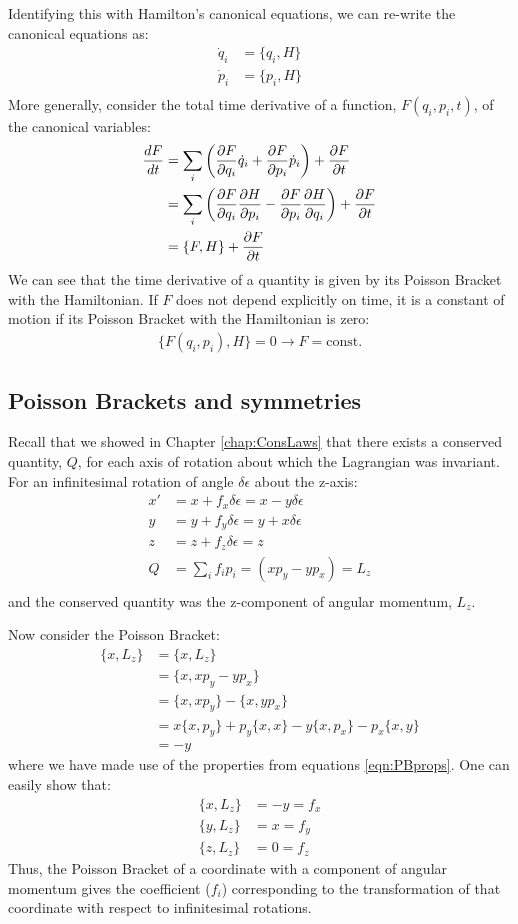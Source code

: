 Identifying this with Hamilton's canonical equations, we can re-write the canonical equations as:
\begin{align}
\dot q_i&=\{q_i,H\}\nonumber\\
\dot p_i&=\{p_i,H\}\nonumber\\
\end{align}
More generally, consider the total time derivative of a function, $F(q_i,p_i,t)$, of the canonical variables:
\begin{align}
\frac{dF}{dt}&=\sum_i\left(\frac{\partial F}{\partial q_i}\dot q_i+\frac{\partial F}{\partial p_i}\dot p_i\right)+\frac{\partial F}{\partial t}\nonumber\\
&=\sum_i\left(\frac{\partial F}{\partial q_i}\frac{\partial H}{\partial p_i}-\frac{\partial F}{\partial p_i}\frac{\partial H}{\partial q_i}\right)+\frac{\partial F}{\partial t}\nonumber\\
&=\{F,H\}+\frac{\partial F}{\partial t}
\end{align}
We can see that the time derivative of a quantity is given by its Poisson Bracket with the Hamiltonian. If $F$ does not depend explicitly on time, it is a constant of motion if its Poisson Bracket with the Hamiltonian is zero:
\begin{align}
\{F(q_i,p_i),H\}=0 \to F=\text{const.}
\end{align}


\subsection{Poisson Brackets and symmetries}
Recall that we showed in Chapter \ref{chap:ConsLaws} that there exists a conserved quantity, $Q$, for each axis of rotation about which the Lagrangian was invariant.  For an infinitesimal rotation of angle $\delta \epsilon$ about the z-axis:
\begin{align}
x' &= x+f_x\delta\epsilon = x-y\delta \epsilon\nonumber\\
y &= y+f_y\delta\epsilon = y+x\delta \epsilon\nonumber\\
z &= z+f_z\delta\epsilon = z \nonumber\\
Q&=\sum_i f_ip_i=(xp_y - yp_x)=L_z\nonumber\\
\end{align}
and the conserved quantity was the z-component of angular momentum, $L_z$.

Now consider the Poisson Bracket:
\begin{align}
\{x,L_z\}&=\{x,L_z\}\nonumber\\
&=\{x,xp_y - yp_x\}\nonumber\\
&=\{x,xp_y\} - \{x,yp_x\}\nonumber\\
&=x\{x,p_y\}+p_y\{x,x\} - y\{x,p_x\}-p_x\{x,y\}\nonumber\\
&=-y
\end{align}
where we have made use of the properties from equations \ref{eqn:PBprops}. One can easily show that:
\begin{align}
\{x,L_z\}&=-y=f_x\nonumber\\
\{y,L_z\}&=x=f_y\nonumber\\
\{z,L_z\}&=0=f_z
\end{align}
Thus, the Poisson Bracket of a coordinate with a component of angular momentum gives the coefficient ($f_i$) corresponding to the transformation of that coordinate with respect to infinitesimal rotations.

